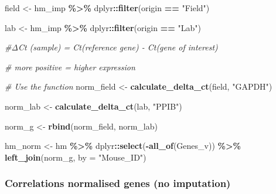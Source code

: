 \documentclass[
]{article}
\newenvironment{Shaded}{\begin{snugshade}}{\end{snugshade}}
\newcommand{\AttributeTok}[1]{\textcolor[rgb]{0.13,0.29,0.53}{#1}}
\newcommand{\CommentTok}[1]{\textcolor[rgb]{0.56,0.35,0.01}{\textit{#1}}}
\newcommand{\FunctionTok}[1]{\textcolor[rgb]{0.13,0.29,0.53}{\textbf{#1}}}
\newcommand{\NormalTok}[1]{#1}
\newcommand{\OtherTok}[1]{\textcolor[rgb]{0.56,0.35,0.01}{#1}}
\newcommand{\SpecialCharTok}[1]{\textcolor[rgb]{0.81,0.36,0.00}{\textbf{#1}}}
\newcommand{\StringTok}[1]{\textcolor[rgb]{0.31,0.60,0.02}{#1}}
\begin{document}
\begin{Shaded}
\begin{Highlighting}[]
\NormalTok{field }\OtherTok{\textless{}{-}}\NormalTok{ hm\_imp }\SpecialCharTok{\%\textgreater{}\%}
\NormalTok{    dplyr}\SpecialCharTok{::}\FunctionTok{filter}\NormalTok{(origin }\SpecialCharTok{==} \StringTok{"Field"}\NormalTok{)}

\NormalTok{lab }\OtherTok{\textless{}{-}}\NormalTok{ hm\_imp }\SpecialCharTok{\%\textgreater{}\%}
\NormalTok{    dplyr}\SpecialCharTok{::}\FunctionTok{filter}\NormalTok{(origin }\SpecialCharTok{==} \StringTok{"Lab"}\NormalTok{)}

\CommentTok{\#ΔCt (sample) = Ct(reference gene) {-} Ct(gene of interest) }

\CommentTok{\# more positive = higher expression }

\CommentTok{\# Use the function}
\NormalTok{norm\_field }\OtherTok{\textless{}{-}} \FunctionTok{calculate\_delta\_ct}\NormalTok{(field, }\StringTok{"GAPDH"}\NormalTok{)}

\NormalTok{norm\_lab }\OtherTok{\textless{}{-}} \FunctionTok{calculate\_delta\_ct}\NormalTok{(lab, }\StringTok{"PPIB"}\NormalTok{)}

\NormalTok{norm\_g }\OtherTok{\textless{}{-}} \FunctionTok{rbind}\NormalTok{(norm\_field, norm\_lab)}

\NormalTok{hm\_norm }\OtherTok{\textless{}{-}}\NormalTok{ hm }\SpecialCharTok{\%\textgreater{}\%}
\NormalTok{    dplyr}\SpecialCharTok{::}\FunctionTok{select}\NormalTok{(}\SpecialCharTok{{-}}\FunctionTok{all\_of}\NormalTok{(Genes\_v)) }\SpecialCharTok{\%\textgreater{}\%}
    \FunctionTok{left\_join}\NormalTok{(norm\_g, }\AttributeTok{by =} \StringTok{"Mouse\_ID"}\NormalTok{)}
\end{Highlighting}
\end{Shaded}

\hypertarget{correlations-normalised-genes-no-imputation-1}{%
\subsubsection{Correlations normalised genes (no
imputation)}\label{correlations-normalised-genes-no-imputation-1}}
\end{document}
